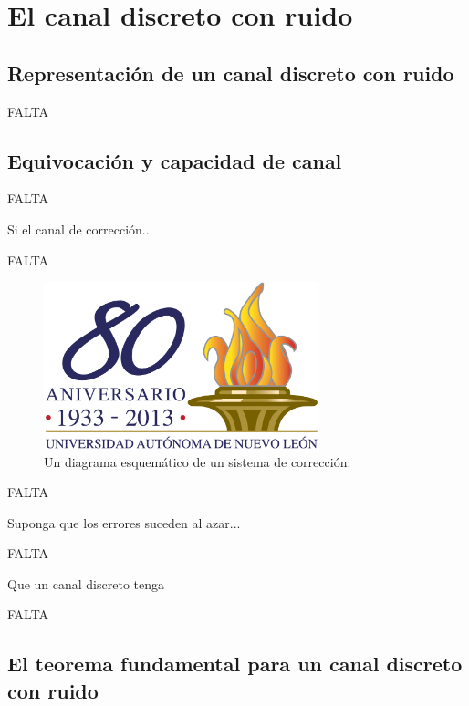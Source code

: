 \part{El canal discreto con ruido}
\label{part:2}

\chapter{Representaci\'{o}n de un canal discreto con ruido}
\label{sec:11}

FALTA

\clearpage

\chapter{Equivocaci\'{o}n y capacidad de canal}
\label{sec:12}

FALTA

\begin{theorem}
\label{th:10}
Si el canal de correcci\'{o}n...
\end{theorem}

FALTA

\begin{figure}[!ht]
\centerline{\includegraphics[width=80mm]{ejemplo.png}}
\caption{Un diagrama esquem\'{a}tico de un sistema de correcci\'{o}n.}
\label{fig:8}
\end{figure}

FALTA

\begin{exmp}
Suponga que los errores suceden al azar...
\end{exmp}

FALTA

\begin{theorem}
\label{th:11}
Que un canal discreto tenga
\end{theorem}

FALTA

\clearpage

\chapter{El teorema fundamental para un canal discreto con ruido}
\label{sec:13}

